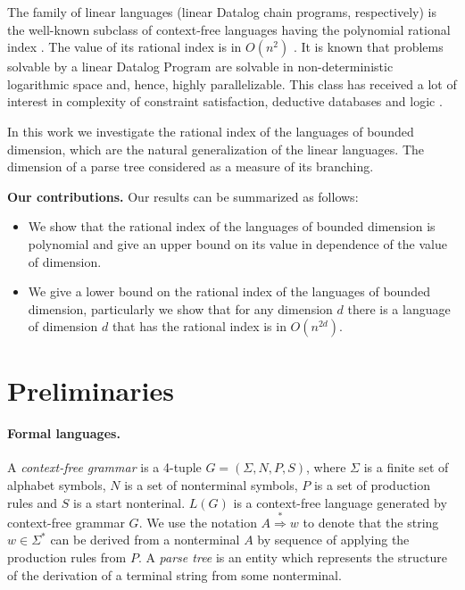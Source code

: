 \documentclass[11pt,a4paper]{article} %
\begin{document}
The family of linear languages (linear Datalog chain programs, respectively) is the well-known subclass of context-free languages having the polynomial rational index \cite{RatBasic, Ullman}. The value of its rational index is in $O(n^2)$ \cite{RatBasic}. It is known that problems solvable by a linear Datalog Program are solvable in non-deterministic logarithmic space and, hence,  highly parallelizable. This class has received a lot of interest in complexity of constraint satisfaction, deductive databases and logic \cite{ linearisability, Dalmau2005LinearDA, linopt, Ullman}. 


In this work we investigate the rational index of the languages of bounded dimension, which are the natural generalization of the linear languages. The dimension of a parse tree considered as a measure of its branching. 


\textbf{Our contributions.} Our results can be summarized as follows:
\begin{itemize}
\item We show that the rational index of the languages of bounded dimension is polynomial and give an upper bound on its value in dependence of the value of dimension.
\item We give a lower bound on the rational index of the languages of bounded dimension, particularly we show that for any dimension $d$ there is a language of dimension $d$ that has the rational index is in $O(n^{2d})$.

\end{itemize}





\section{Preliminaries}
\label{sec:prel}
\label{preliminaries}
\paragraph{Formal languages.} 
A \textit{context-free grammar} is a 4-tuple $G = (\Sigma, N, P, S)$, where $\Sigma$ is a finite set of alphabet symbols,  $N$ is a set of nonterminal symbols, $P$ is a set of production rules and $S$ is a start nonterinal. $L(G)$ is a context-free language generated by context-free grammar $G$. We use the notation $A \stackrel {*}{\Rightarrow } w$  to denote that the string $w \in \Sigma^*$ can be derived from a nonterminal $A$ by sequence of applying the production rules from $P$. A \textit{parse tree} is an entity which represents the structure of the derivation of a terminal string from some nonterminal.
\end{document}
